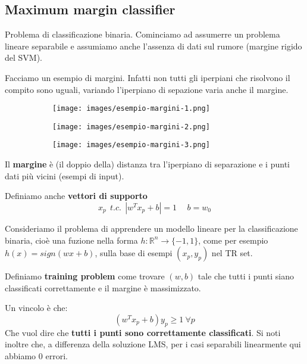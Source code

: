 \subsection{Maximum margin classifier}
Problema di classificazione binaria. Cominciamo ad assumerre un problema lineare separabile e assumiamo anche l'assenza di dati sul rumore (margine rigido del SVM).
\begin{example}
    Facciamo un esempio di margini. Infatti non tutti gli iperpiani che risolvono il compito sono uguali, variando l'iperpiano di sepazione varia anche il margine.
    \begin{figure}[h!]
        \centering 
        \begin{subfigure}{.25\textwidth}
            \texttt{[image: images/esempio-margini-1.png]}
        \end{subfigure}
        \begin{subfigure}{.30\textwidth}
            \texttt{[image: images/esempio-margini-2.png]}
        \end{subfigure}
        \begin{subfigure}{.43\textwidth}
            \texttt{[image: images/esempio-margini-3.png]}
        \end{subfigure}
    \end{figure}
\end{example}
\begin{definition}
    Il \textbf{margine} è (il doppio della) distanza tra l'iperpiano di separazione e i punti dati più vicini (esempi di input).
\end{definition}
\begin{definition}
    Definiamo anche \textbf{vettori di supporto}
    $$x_p \:\: t.c. \:\: |w^T x_p + b| = 1 \hspace{15pt} b = w_0$$
\end{definition}
Consideriamo il problema di apprendere un modello lineare per la classificazione binaria, cioè una fuzione nella forma
$h: \mathbb{R}^n \to \{-1, 1\}$, come per esempio $h(x) = sign(wx + b)$, sulla base di esempi $(x_p, y_p)$ nel TR set.
\begin{definition}
    Definiamo \textbf{training problem} come trovare $(w, b)$ tale che tutti i punti siano classificati correttamente e il 
    margine è massimizzato.
\end{definition}
\hspace{-15pt}Un vincolo è che:
$$(w^T x_p + b) y_p \geq 1 \: \forall p$$
Che vuol dire che \textbf{tutti i punti sono correttamente classificati}. Si noti inoltre che, a differenza della soluzione LMS,
per i casi separabili linearmente qui abbiamo 0 errori.